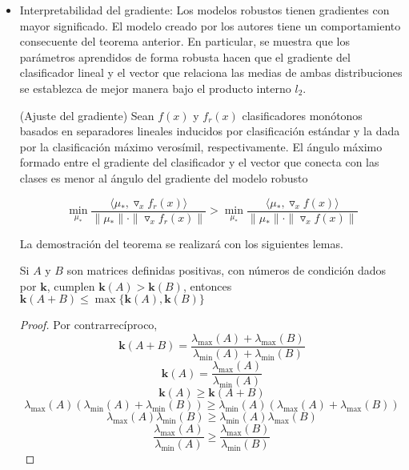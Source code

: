 \begin{itemize}
\begin{proof}
$$\lambda \leq \frac{1}{\lambda_{\text{min}}(\Sigma)} \left( \sqrt{\frac{||\Sigma||_F}{\lambda_{\text{min}}(\Sigma)\epsilon'}} + 1 \right) = \frac{\|\Sigma \|_F + \sqrt{\epsilon \cdot \lambda_{\text{min}}(\Sigma)}}{\lambda_{\text{min}}(\Sigma)^{\frac{3}{2}} \sqrt{\epsilon}}$$

Finalmente, tal y como prueban los autores, al cumplirse para un problema minimax que
$$\Sigma_* = \frac{1}{\lambda} I_n + \frac{1}{2} \Sigma + \sqrt{\frac{1}{\lambda} \Sigma + \frac{1}{4} \Sigma^2}$$

se termina obteniendo lo que se quería probar.
\end{proof}

	\item Interpretabilidad del gradiente: Los modelos robustos tienen gradientes con mayor significado. El modelo creado por los autores tiene un comportamiento consecuente del teorema anterior. En particular, se muestra que los parámetros aprendidos de forma robusta hacen que el gradiente del clasificador lineal y el vector que relaciona las medias de ambas distribuciones se establezca de mejor manera bajo el producto interno $l_2$.
	
\begin{teorema} (Ajuste del gradiente) \label{teom215}
Sean $f(x)$ y $f_r(x)$ clasificadores monótonos basados en separadores lineales inducidos por clasificación estándar y la dada por la clasificación máximo verosímil, respectivamente. El ángulo máximo formado entre el gradiente del clasificador y el vector que conecta con las clases es menor al ángulo del gradiente del modelo robusto

$$\min_{\mu_*} \frac{ \langle \mu_*,\triangledown_x f_r(x) \rangle}{\|\mu_* \| \cdot \|\triangledown_x f_r(x) \|} > \min_{\mu_*} \frac{\langle \mu_*,\triangledown_x f(x) \rangle}{\|\mu_* \| \cdot \|\triangledown_x f(x) \|}$$
\end{teorema}

La demostración del teorema se realizará con los siguientes lemas.

\begin{lema}
Si $A$ y $B$ son matrices definidas positivas, con números de condición dados por $\mathbf{k}$, cumplen $\mathbf{k}(A) > \mathbf{k}(B)$, entonces $\mathbf{k}(A+B) \leq \max\{\mathbf{k}(A),\mathbf{k}(B)\}$
\end{lema}
\begin{proof}
Por contrarrecíproco,
$$\mathbf{k}(A+B) = \frac{\lambda_{\text{max}}(A) + \lambda_{\text{max}}(B)}{\lambda_{\text{min}}(A) + \lambda_{\text{min}}(B)}$$
$$\mathbf{k}(A) = \frac{\lambda_{\text{max}}(A)}{\lambda_{\text{min}}(A)}$$
$$\mathbf{k}(A) \geq \mathbf{k}(A+B)$$
$$\lambda_{\text{max}}(A) (\lambda_{\text{min}}(A) + \lambda_{\text{min}}(B)) \geq \lambda_{\text{min}}(A) (\lambda_{\text{max}}(A) + \lambda_{\text{max}}(B))$$
$$\lambda_{\text{max}}(A) \lambda_{\text{min}}(B) \geq \lambda_{\text{min}}(A) \lambda_{\text{max}}(B)$$
$$\frac{\lambda_{\text{max}}(A)}{\lambda_{\text{min}}(A)} \geq \frac{\lambda_{\text{max}}(B)}{\lambda_{\text{min}}(B)}$$
\end{proof}


\end{itemize}

